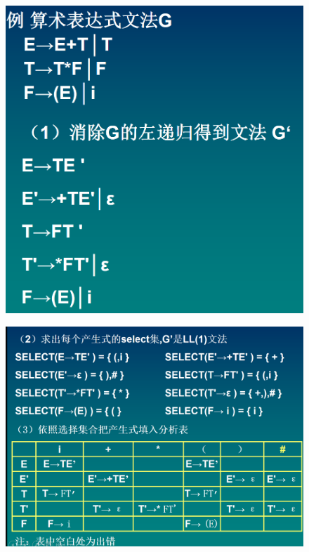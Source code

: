 \documentclass[UTF8,a4paper]{ctexart}
\begin{document}
\begin{figure}[H]
  \centering
  \includegraphics[scale = 0.3]{assets/CompilerConstructionPrinciples_7723b.png}
\end{figure}

 \begin{figure}[H]
  \centering
  \includegraphics[scale = 0.3]{assets/CompilerConstructionPrinciples_7a51c.png}
 \end{figure}
\end{document}
